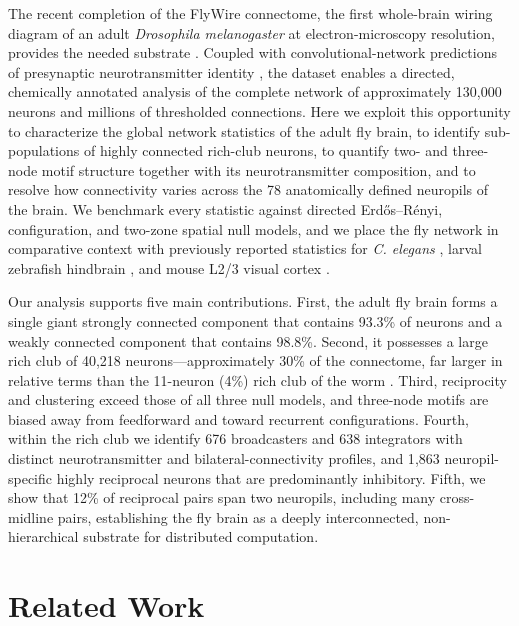 The recent completion of the FlyWire connectome, the first whole-brain wiring diagram of an adult \textit{Drosophila melanogaster} at electron-microscopy resolution, provides the needed substrate \cite{dorkenwald2024flywire,schlegel2024whole,turner2021automated}. Coupled with convolutional-network predictions of presynaptic neurotransmitter identity \cite{eckstein2024neurotransmitter}, the dataset enables a directed, chemically annotated analysis of the complete network of approximately 130,000 neurons and millions of thresholded connections. Here we exploit this opportunity to characterize the global network statistics of the adult fly brain, to identify sub-populations of highly connected rich-club neurons, to quantify two- and three-node motif structure together with its neurotransmitter composition, and to resolve how connectivity varies across the 78 anatomically defined neuropils of the brain. We benchmark every statistic against directed Erd{\H o}s--R{\'e}nyi, configuration, and two-zone spatial null models, and we place the fly network in comparative context with previously reported statistics for \textit{C. elegans} \cite{varshney2011structural,cook2019whole}, larval zebrafish hindbrain \cite{svara2022automated}, and mouse L2/3 visual cortex \cite{song2005highly}.

Our analysis supports five main contributions. First, the adult fly brain forms a single giant strongly connected component that contains 93.3\% of neurons and a weakly connected component that contains 98.8\%. Second, it possesses a large rich club of 40{,}218 neurons---approximately 30\% of the connectome, far larger in relative terms than the 11-neuron (4\%) rich club of the worm \cite{towlson2013rich}. Third, reciprocity and clustering exceed those of all three null models, and three-node motifs are biased away from feedforward and toward recurrent configurations. Fourth, within the rich club we identify 676 broadcasters and 638 integrators with distinct neurotransmitter and bilateral-connectivity profiles, and 1{,}863 neuropil-specific highly reciprocal neurons that are predominantly inhibitory. Fifth, we show that 12\% of reciprocal pairs span two neuropils, including many cross-midline pairs, establishing the fly brain as a deeply interconnected, non-hierarchical substrate for distributed computation.

\section{Related Work}

